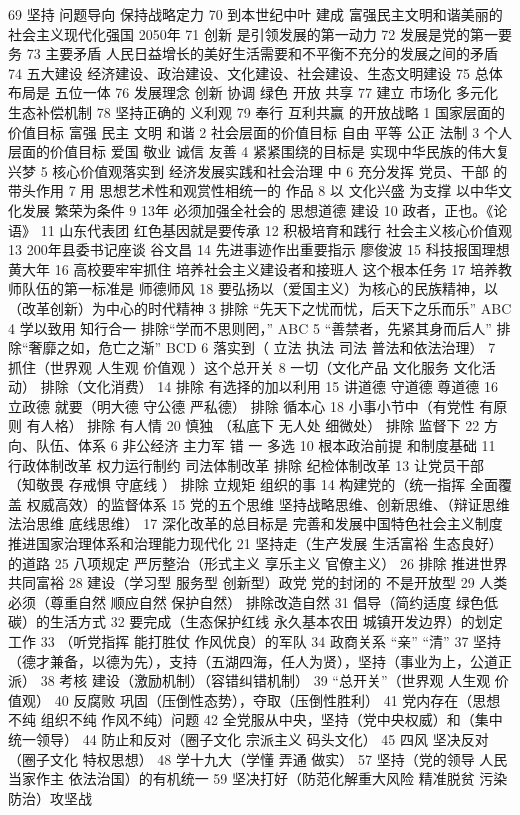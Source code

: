 \documentclass[11pt]{ctexart}
\begin{document}
69 坚持 问题导向 保持战略定力
70 到本世纪中叶 建成 富强民主文明和谐美丽的社会主义现代化强国 2050年
71 创新 是引领发展的第一动力
72 发展是党的第一要务
73 主要矛盾
 人民日益增长的美好生活需要和不平衡不充分的发展之间的矛盾
74 五大建设
经济建设、政治建设、文化建设、社会建设、生态文明建设
75 总体布局是 五位一体
76 发展理念
创新 协调 绿色 开放 共享
77 建立 市场化 多元化 生态补偿机制
78 坚持正确的 义利观
79 奉行 互利共赢 的开放战略
1 国家层面的价值目标
富强 民主 文明 和谐
2 社会层面的价值目标
自由 平等 公正 法制
3 个人层面的价值目标
爱国 敬业 诚信 友善
4 紧紧围绕的目标是
实现中华民族的伟大复兴梦
5 核心价值观落实到
经济发展实践和社会治理 中
6 充分发挥 党员、干部 的带头作用
7 用 思想艺术性和观赏性相统一的 作品
8 以 文化兴盛 为支撑 以中华文化发展 繁荣为条件
9 13年 必须加强全社会的 思想道德 建设
10 政者，正也。《论语》
11 山东代表团 红色基因就是要传承
12 积极培育和践行 社会主义核心价值观
13 200年县委书记座谈 谷文昌
14 先进事迹作出重要指示 廖俊波
15 科技报国理想 黄大年
16 高校要牢牢抓住 培养社会主义建设者和接班人 这个根本任务
17 培养教师队伍的第一标准是 师德师风
18 要弘扬以（爱国主义）为核心的民族精神，以（改革创新）为中心的时代精神
3 排除 “先天下之忧而忧，后天下之乐而乐” ABC
4 学以致用 知行合一
排除“学而不思则罔，” ABC
5 “善禁者，先紧其身而后人”
排除“奢靡之如，危亡之渐”
BCD
6 落实到（ 立法 执法 司法 普法和依法治理）
7 抓住（世界观 人生观 价值观 ）这个总开关
8 一切（文化产品 文化服务 文化活动） 排除（文化消费）
14 排除 有选择的加以利用
15 讲道德 守道德 尊道德
16 立政德 就要（明大德 守公德 严私德）
排除 循本心
18 小事小节中（有党性 有原则 有人格）
排除 有人情
20 慎独 （私底下 无人处 细微处）
排除 监督下
22 方向、队伍、体系
6 非公经济 主力军 错
一 多选
10 根本政治前提 和制度基础
11 行政体制改革 权力运行制约 司法体制改革
排除 纪检体制改革
13 让党员干部 （知敬畏 存戒惧 守底线 ）
排除 立规矩 组织的事
14 构建党的（统一指挥 全面覆盖 权威高效）的监督体系
15 党的五个思维 坚持战略思维、创新思维、（辩证思维 法治思维 底线思维）
17 深化改革的总目标是
完善和发展中国特色社会主义制度
推进国家治理体系和治理能力现代化
21 坚持走（生产发展 生活富裕 生态良好）的道路
25 八项规定 严厉整治（形式主义 享乐主义 官僚主义）
26 排除 推进世界共同富裕
28 建设（学习型 服务型 创新型）政党
党的封闭的 不是开放型
29 人类必须（尊重自然 顺应自然 保护自然）
排除改造自然
31 倡导（简约适度 绿色低碳）的生活方式
32 要完成（生态保护红线 永久基本农田 城镇开发边界）的划定工作
33 （听党指挥 能打胜仗 作风优良）的军队
34 政商关系 “亲” “清”
37 坚持（德才兼备，以德为先），支持（五湖四海，任人为贤），坚持（事业为上，公道正派）
38 考核 建设（激励机制）（容错纠错机制）
39 “总开关”（世界观 人生观 价值观）
40 反腐败 巩固（压倒性态势），夺取（压倒性胜利）
41 党内存在（思想不纯 组织不纯 作风不纯）问题
42 全党服从中央，坚持（党中央权威）和（集中统一领导）
44 防止和反对（圈子文化 宗派主义 码头文化）
45 四风 坚决反对（圈子文化 特权思想）
48 学十九大（学懂 弄通 做实）
57 坚持（党的领导 人民当家作主 依法治国）的有机统一
59 坚决打好（防范化解重大风险 精准脱贫 污染防治）攻坚战
\end{document}
